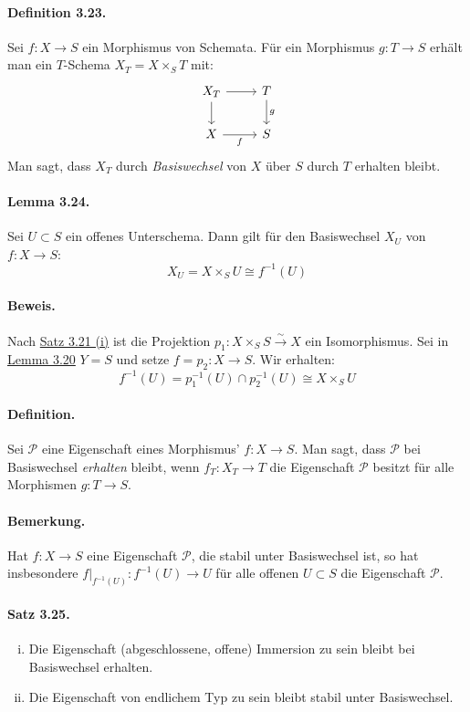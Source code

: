 \documentclass[11pt,b5paper,openany]{memoir}
\def \qedhere {\tag*{$\square$}}
\begin{document}
\paragraph{Definition 3.23.}\label{3.23} Sei $f:X\to S$ ein Morphismus von Schemata. Für ein Morphismus $g:T\to S$ erhält man ein $T$-Schema $X_T=X\times_ST$ mit:
\[\begin{tikzcd}
X_T\ar[r]\ar[d] & T\ar[d, "g"]\\
X\ar[r, "f"'] & S
\end{tikzcd} \]
Man sagt, dass $X_T$ durch \textit{Basiswechsel} von $X$ über $S$ durch $T$ erhalten bleibt.

\paragraph{Lemma 3.24.}\label{3.24} Sei $U\subset S$ ein offenes Unterschema. Dann gilt für den Basiswechsel $X_U$ von $f:X\to S$:
\[X_U=X\times_SU\cong f^{-1}(U) \]

\paragraph{Beweis.} Nach \hyperref[3.21]{Satz 3.21 (i)} ist die Projektion $p_1:X\times_SS\stackrel{\sim}{\to} X$ ein Isomorphismus. Sei in \hyperref[3.20]{Lemma 3.20} $Y=S$ und setze $f=p_2:X\to S$. Wir erhalten: \[f^{-1}(U)=p_1^{-1}(U)\cap p_2^{-1}(U)\cong X\times_SU\qedhere\]

\paragraph{Definition.} Sei $\mathcal{P}$ eine Eigenschaft eines Morphismus' $f:X\to S$. Man sagt, dass $\mathcal{P}$ bei Basiswechsel \textit{erhalten} bleibt, wenn $f_T:X_T\to T$ die Eigenschaft $\mathcal{P}$ besitzt für alle Morphismen $g:T\to S$.

\paragraph{Bemerkung.} Hat $f:X \to S$ eine Eigenschaft $\mathcal{P}$, die stabil unter Basiswechsel ist, so hat insbesondere $f|_{f^{-1}(U)}:f^{-1}(U)\to U$ für alle offenen $U\subset S$ die Eigenschaft $\mathcal{P}$.

\paragraph{Satz 3.25.}\label{3.25}\begin{enumerate}[(i)]
\item Die Eigenschaft (abgeschlossene, offene) Immersion zu sein bleibt bei Basiswechsel erhalten.
\item Die Eigenschaft von endlichem Typ zu sein bleibt stabil unter Basiswechsel.
\end{enumerate}
\end{document}
